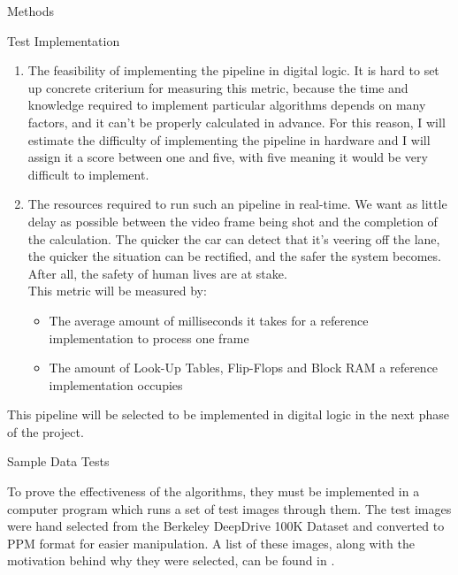 \documentclass{matthijs}
\begin{document}
\begin{hoofdstuk}{Methods}
\begin{paragraaf}{Test Implementation}
\begin{enumerate}
				\item	The feasibility of implementing the pipeline in digital logic.
					It is hard to set up concrete criterium for measuring this metric, because the time and knowledge required to implement particular algorithms depends on many factors, and it can't be properly calculated in advance.
					For this reason, I will estimate the difficulty of implementing the pipeline in hardware and I will assign it a score between one and five, with five meaning it would be very difficult to implement.

				\item	The resources required to run such an pipeline in real-time.
					We want as little delay as possible between the video frame being shot and the completion of the calculation.
					The quicker the car can detect that it's veering off the lane, the quicker the situation can be rectified, and the safer the system becomes.
					After all, the safety of human lives are at stake.\\
					This metric will be measured by:

					\begin{itemize}

						\item	The average amount of milliseconds it takes for a reference implementation to process one frame
						
						\item	The amount of Look-Up Tables, Flip-Flops and Block RAM a reference implementation occupies

					\end{itemize}

			\end{enumerate}

			This pipeline will be selected to be implemented in digital logic in the next phase of the project.

		\end{paragraaf}

		\begin{paragraaf}{Sample Data Tests}

			To prove the effectiveness of the algorithms, they must be implemented in a computer program which runs a set of test images through them.
			The test images were hand selected from the Berkeley DeepDrive 100K Dataset \cite{yu2020bdd100k} and converted to PPM format for easier manipulation.
			A list of these images, along with the motivation behind why they were selected, can be found in .


\end{paragraaf}
\end{hoofdstuk}
\end{document}
